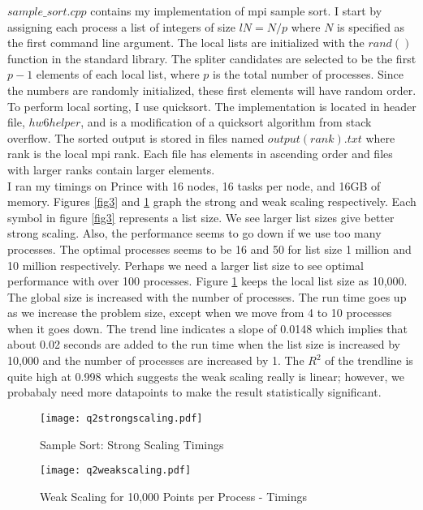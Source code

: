 \documentclass[10pt]{article}
\begin{document}
$sample\_sort.cpp$ contains my implementation of mpi sample sort. I start by assigning each process a list of integers of size  $lN = N/p$ where $N$ is specified as the first command line argument. The local lists are initialized with the $rand()$ function in the standard library. The spliter candidates are selected to be the first $p-1$ elements of each local list, where $p$ is the total number of processes. Since the numbers are randomly initialized, these first elements will have random order. To perform local sorting, I use quicksort. The implementation is located in header file, $hw6helper$, and is a modification of a quicksort algorithm from stack overflow. The sorted output is stored in files named $output(rank).txt$ where rank is the local mpi rank. Each file has elements in ascending order and files with larger ranks contain larger elements.\\

I ran my timings on Prince with 16 nodes, 16 tasks per node, and 16GB of memory. Figures \ref{fig3} and \ref{fig4} graph the strong and weak scaling respectively. Each symbol in figure \ref{fig3} represents a list size. We see larger list sizes give better strong scaling. Also, the performance seems to go down if we use too many processes. The optimal processes seems to be 16 and 50 for list size 1 million and 10 million respectively. Perhaps we need a larger list size to see optimal performance with over 100 processes. Figure \ref{fig4} keeps the local list size as 10,000. The global size is increased with the number of processes. The run time goes up as we increase the problem size, except when we move from 4 to 10 processes when it goes down. The trend line indicates a slope of 0.0148 which implies that about 0.02 seconds are added to the run time when the list size is increased by 10,000 and the number of processes are increased by 1. The $R^2$ of the trendline is quite high at 0.998 which suggests the weak scaling really is linear; however, we probabaly need more datapoints to make the result statistically significant.

\lipsum

\begin{figure}[!h]
    \centering
    \begin{minipage}{0.45\textwidth}
        \centering
        \texttt{[image: q2strongscaling.pdf]} %
        \caption{Sample Sort: Strong Scaling Timings}
        \label{fig3}
    \end{minipage}\hfill
         \begin{minipage}{0.45\textwidth}
        \centering
        \texttt{[image: q2weakscaling.pdf]} %
        \caption{Weak Scaling for 10,000 Points per Process - Timings}
        \label{fig4}
    \end{minipage}
\end{figure}
\end{document}
